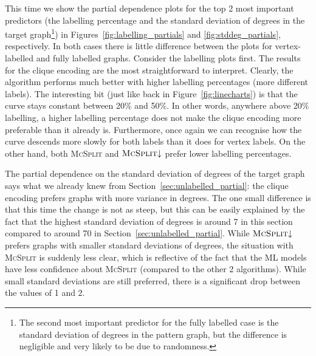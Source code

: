 \documentclass{l4proj}
\theoremstyle{definition}
\theoremstyle{remark}
\begin{document}
This time we show the partial dependence plots for the top 2 most
important predictors (the labelling percentage and the standard deviation of
degrees in the target graph\footnote{The second most important predictor for the
fully labelled case is the standard deviation of degrees in the pattern graph,
but the difference is negligible and very likely to be due to randomness.}) in
Figures~\ref{fig:labelling_partials} and \ref{fig:stddeg_partials},
respectively. In both cases there is little difference between the plots for
vertex-labelled and fully labelled graphs. Consider the labelling plots first.
The results for the clique encoding are the most straightforward to interpret.
Clearly, the algorithm performs much better with higher labelling percentages
(more different labels). The interesting bit (just like back in
Figure~\ref{fig:linecharts}) is that the curve stays constant between 20\% and
50\%. In other words, anywhere above 20\% labelling, a higher labelling
percentage does not make the clique encoding more preferable than it already is.
Furthermore, once again we can recognise how the curve descends more slowly for
both labels than it does for vertex labels. On the other hand, both
\textsc{McSplit} and $\textsc{McSplit}{\downarrow}$ prefer lower labelling
percentages.

The partial dependence on the standard deviation of degrees of the target graph
says what we already knew from Section~\ref{sec:unlabelled_partial}: the clique
encoding prefers graphs with more variance in degrees. The one small difference
is that this time the change is not as steep, but this can be easily explained
by the fact that the highest standard deviation of degrees is around 7 in this
section compared to around 70 in Section~\ref{sec:unlabelled_partial}. While
$\textsc{McSplit}{\downarrow}$ prefers graphs with smaller standard deviations of
degrees, the situation with \textsc{McSplit} is suddenly less clear, which is
reflective of the fact that the ML models have less confidence about
\textsc{McSplit} (compared to the other 2 algorithms). While small standard
deviations are still preferred, there is a significant drop between the values
of 1 and 2.
\end{document}
